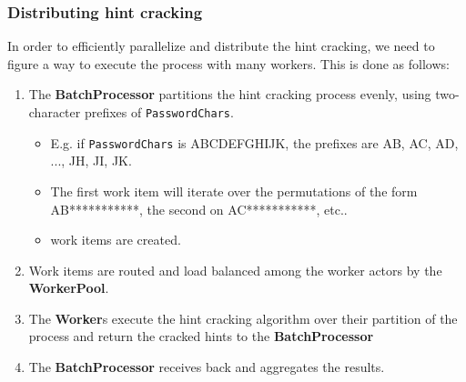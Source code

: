 \documentclass{beamer}
\begin{document}
\begin{frame}
	\frametitle{Distributing hint cracking}

	In order to efficiently parallelize and distribute the hint cracking, we need to figure a way to execute the process with many workers. This is done as follows:

	\begin{enumerate}

		\item The \textbf{BatchProcessor} partitions the hint cracking process evenly, using two-character prefixes of \texttt{PasswordChars}.

		\begin{itemize}

			\item E.g. if \texttt{PasswordChars} is ABCDEFGHIJK, the prefixes are AB, AC, AD, ..., JH, JI, JK.

			\item The first work item will iterate over the permutations of the form AB***********, the second on AC***********, etc..

			\item {} work items are created.

		\end{itemize}

		\pause

		\item Work items are routed and load balanced among the worker actors by the \textbf{WorkerPool}.

		\item The \textbf{Worker}s execute the hint cracking algorithm over their partition of the process and return the cracked hints to the \textbf{BatchProcessor}

		\item The \textbf{BatchProcessor} receives back and aggregates the results.

	\end{enumerate}

\end{frame}
\end{document}
